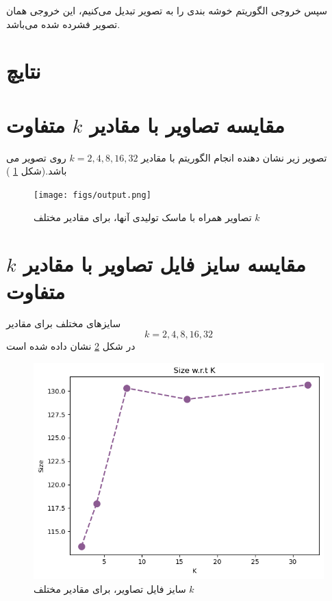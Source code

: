\documentclass[11pt]{article}
\begin{document}
سپس خروجی الگوریتم خوشه بندی را به تصویر تبدیل می‌کنیم، این خروجی همان تصویر فشرده شده می‌باشد.
\newpage
\section{نتایچ}
\section{مقایسه تصاویر با مقادیر $k$‌ متفاوت}
تصویر زیر نشان دهنده انجام الگوریتم با مقادیر
$k = 2, 4, 8, 16, 32$
روی تصویر می باشد.(شکل 
\ref{fig: dif k}
)
\begin{figure}[H]
	\centering
	\texttt{[image: figs/output.png]}
	\caption{تصاویر همراه با ماسک تولیدی آنها، برای مقادیر مختلف $k$}
	\label{fig: dif k}
\end{figure}
\section{مقایسه سایز فایل تصاویر با مقادیر 
	$k$
	متفاوت
}
	سایز‌های مختلف برای مقادیر 
	$$k = 2, 4, 8, 16, 32$$
	در شکل 
	\ref{fig: dif size}
	نشان داده شده است
	\begin{figure}[H]
		\centering
		\includegraphics[scale=0.6]{figs/output1.png}
		\caption{سایز فایل تصاویر، برای مقادیر مختلف $k$}
		\label{fig: dif size}
	\end{figure}
	
	
	
	
	
	
	
	
	
	
	
	
	
	
	
	
	
	
	
	
\end{document}
